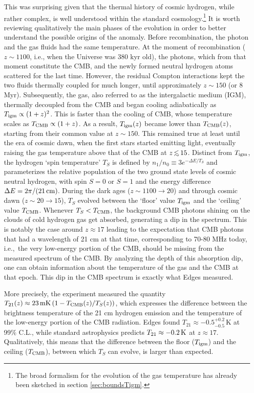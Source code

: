 This was surprising given that the thermal history of cosmic hydrogen, while rather complex, is well understood within the standard cosmology.\footnote{The broad formalism for the evolution of the gas temperature has already been sketched in section \ref{sec:boundsTigm}.} It is worth reviewing qualitatively the main phases of the evolution in order to better understand the possible origins of the anomaly. 
Before recombination, the photon and the gas fluids had the same temperature. At the moment of recombination ($z \sim 1100$, i.e., when the Universe was 380 kyr old), the photons, which from that moment constitute the CMB, and the newly formed neutral hydrogen atoms scattered for the last time. However, the residual Compton interactions kept the two fluids thermally coupled for much longer, until approximately $z \sim 150$ (or 8 Myr). Subsequently, the gas, also referred to as the intergalactic medium (IGM),  thermally decoupled from the CMB and began cooling adiabatically as $T_{\rm igm} \propto (1+z)^2$. This is faster than the cooling of CMB, whose temperature scales as $T_{\rm CMB} \propto (1+z)$. 
 As a result, $T_{\rm igm}(z)$ became lower than $T_{\rm CMB}(z)$, starting from their common value at $z \sim 150$. This remained true at least until the era of cosmic dawn, when the first stars started emitting light, 
 eventually raising the gas temperature above that of the CMB at $z\circa{<} 15$.
Distinct from $T_{\rm igm}$, the hydrogen `spin temperature' $T_S$ is defined by $n_1/n_0 \equiv 3 e^{-\Delta E/T_S}$ and parameterizes the relative population of the two ground state levels of cosmic neutral hydrogen, with spin $S=0$ or $S=1$ and the energy difference $\Delta E = 2\pi/(21 \,{\rm cm})$. During the dark ages ($z \sim 1100 \to 20$) and through cosmic dawn ($z \sim 20 \to 15$), $T_S$ evolved between the `floor' value $T_{\rm igm}$ and the `ceiling' value $T_{\rm CMB}$. 
Whenever $T_S < T_{\rm CMB}$, the background CMB photons shining on the clouds of cold hydrogen gas get absorbed, generating a dip in the spectrum. 
This is notably the case around $z \approx 17$ leading to the expectation that CMB photons that had a wavelength of 21 cm at that time, corresponding to 70-80 MHz today, i.e.,\ the very low-energy portion of the CMB, should be missing from the measured spectrum of the CMB. By analyzing the depth of this absorption dip, one can obtain information about the temperature of the gas and the CMB at that epoch. 
This dip in the CMB spectrum is exactly what {\sc Edges} measured. 


More precisely, the experiment measured the quantity $T_{21} (z) \approx  23 \,   \mathrm{mK} \left(1 - T_{\rm CMB}(z)/T_{S}(z) \right)$, which expresses the difference between the brightness temperature of the 21 cm hydrogen emission and the temperature of the low-energy portion of the CMB radiation.  
{\sc Edges} found $T_{21} \approx -0.5^{+0.2}_{-0.5} \, \mathrm{K} $ at 99\% C.L., while standard astrophysics predicts $T_{21}\approx -0.2\,{\rm K}$ at $z\approx 17$. Qualitatively, this means that the difference between the floor ($T_{\rm igm}$) and the ceiling ($T_{\rm CMB}$), between which $T_S$ can evolve, is larger than expected.

